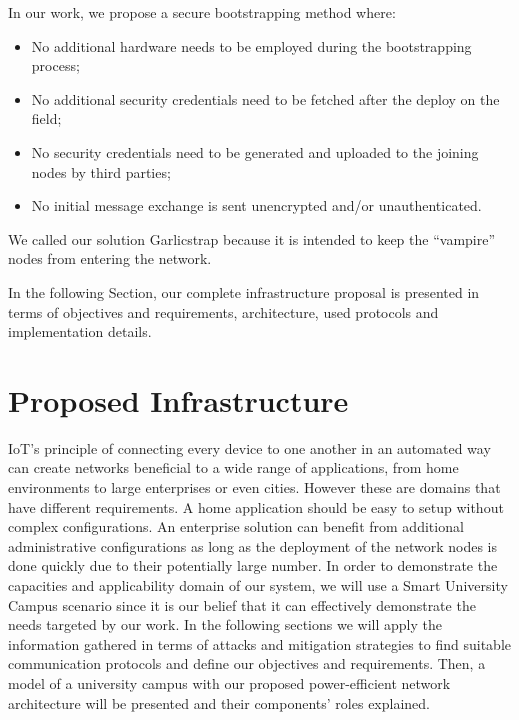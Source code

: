 \documentclass{sig-alternate-05-2015}
\begin{document}
In our work, we propose a secure bootstrapping method where:
\begin{itemize}
	\item No additional hardware needs to be employed during the bootstrapping process;
	\item No additional security credentials need to be fetched after the deploy on the field;
	\item No security credentials need to be generated and uploaded to the joining nodes by third parties;
	\item No initial message exchange is sent unencrypted and/or unauthenticated.
\end{itemize}

We called our solution Garlicstrap because it is intended to keep the ``vampire'' nodes from entering the network\footnotemark. 

In the following Section, our complete infrastructure proposal is presented in terms of objectives and requirements, architecture, used protocols and implementation details. 

\section{Proposed Infrastructure}
\label{sec:proposed_infrastructure}
\gls{IoT}'s principle of connecting every device to one another in an automated way can create networks beneficial to a wide range of applications, from home environments to large enterprises or even cities. 
However these are domains that have different requirements. 
A home application should be easy to setup without complex configurations. 
An enterprise solution can benefit from additional administrative configurations as long as the deployment of the network nodes is done quickly due to their potentially large number. 
In order to demonstrate the capacities and applicability domain of our system, we will use a Smart University Campus scenario since it is our belief that it can effectively demonstrate the needs targeted by our work.
In the following sections we will apply the information gathered in terms of attacks and mitigation strategies to find suitable communication protocols and define our objectives and requirements. 
Then, a model of a university campus with our proposed power-efficient network architecture will be presented and their components' roles explained.
\end{document}
